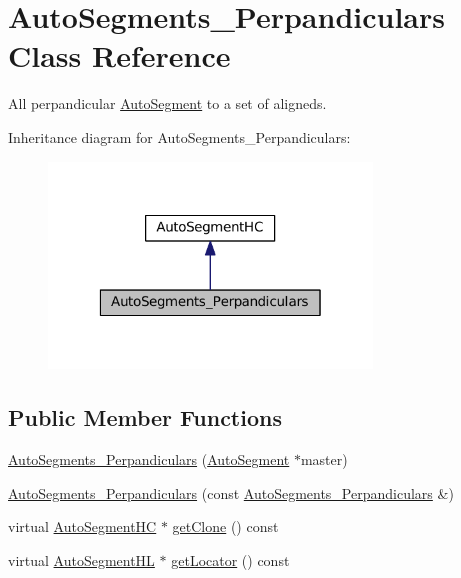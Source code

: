 \hypertarget{classKatabatic_1_1AutoSegments__Perpandiculars}{}\section{Auto\+Segments\+\_\+\+Perpandiculars Class Reference}
\label{classKatabatic_1_1AutoSegments__Perpandiculars}


All perpandicular \mbox{\hyperlink{classKatabatic_1_1AutoSegment}{Auto\+Segment}} to a set of aligneds.  




Inheritance diagram for Auto\+Segments\+\_\+\+Perpandiculars\+:\nopagebreak
\begin{figure}[H]
\begin{center}
\leavevmode
\includegraphics[width=244pt]{classKatabatic_1_1AutoSegments__Perpandiculars__inherit__graph}
\end{center}
\end{figure}
\subsection*{Public Member Functions}
\begin{DoxyCompactItemize}
\item 
\mbox{\hyperlink{classKatabatic_1_1AutoSegments__Perpandiculars_ab5cb1a0042b95cb6bd56997cdfbf0e6f}{Auto\+Segments\+\_\+\+Perpandiculars}} (\mbox{\hyperlink{classKatabatic_1_1AutoSegment}{Auto\+Segment}} $\ast$master)
\item 
\mbox{\hyperlink{classKatabatic_1_1AutoSegments__Perpandiculars_ac2d21dfaa510352fb5c1bd9aa9bd6f94}{Auto\+Segments\+\_\+\+Perpandiculars}} (const \mbox{\hyperlink{classKatabatic_1_1AutoSegments__Perpandiculars}{Auto\+Segments\+\_\+\+Perpandiculars}} \&)
\item 
virtual \mbox{\hyperlink{namespaceKatabatic_acb3628dc7705fefe38a665cfe43efa6e}{Auto\+Segment\+HC}} $\ast$ \mbox{\hyperlink{classKatabatic_1_1AutoSegments__Perpandiculars_a5b26b0698bdcb40cbf51b250dfb21858}{get\+Clone}} () const
\item 
virtual \mbox{\hyperlink{namespaceKatabatic_a40ef13471fd0e797b75d3c436813fe65}{Auto\+Segment\+HL}} $\ast$ \mbox{\hyperlink{classKatabatic_1_1AutoSegments__Perpandiculars_a07665c070fcc269aec02ce842f384483}{get\+Locator}} () const
\end{DoxyCompactItemize}


